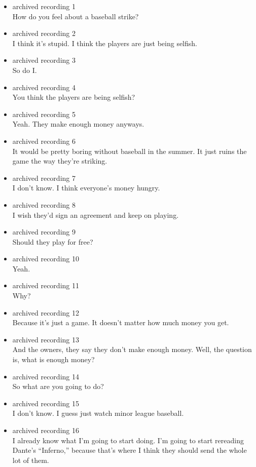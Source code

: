 \begin{itemize}
\item
  archived recording 1\\
  How do you feel about a baseball strike?
\item
  archived recording 2\\
  I think it's stupid. I think the players are just being selfish.
\item
  archived recording 3\\
  So do I.
\item
  archived recording 4\\
  You think the players are being selfish?
\item
  archived recording 5\\
  Yeah. They make enough money anyways.
\item
  archived recording 6\\
  It would be pretty boring without baseball in the summer. It just
  ruins the game the way they're striking.
\item
  archived recording 7\\
  I don't know. I think everyone's money hungry.
\item
  archived recording 8\\
  I wish they'd sign an agreement and keep on playing.
\item
  archived recording 9\\
  Should they play for free?
\item
  archived recording 10\\
  Yeah.
\item
  archived recording 11\\
  Why?
\item
  archived recording 12\\
  Because it's just a game. It doesn't matter how much money you get.
\item
  archived recording 13\\
  And the owners, they say they don't make enough money. Well, the
  question is, what is enough money?
\item
  archived recording 14\\
  So what are you going to do?
\item
  archived recording 15\\
  I don't know. I guess just watch minor league baseball.
\item
  archived recording 16\\
  I already know what I'm going to start doing. I'm going to start
  rereading Dante's ``Inferno,'' because that's where I think they
  should send the whole lot of them.
\end{itemize}

